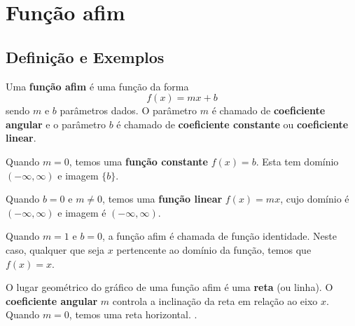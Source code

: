 \documentclass[../main.tex]{subfiles}
\begin{document}
\section{Função afim}\label{sec:FuncAfim}
\subsection{Definição e Exemplos}
Uma \textbf{função afim} é uma função da forma
\begin{equation}
f(x) = mx + b
\end{equation}
sendo $m$ e $b$ parâmetros  dados. O parâmetro $m$ é chamado de \textbf{coeficiente angular} e o parâmetro $b$ é chamado de \textbf{coeficiente constante} ou \textbf{coeficiente linear}.

Quando $m=0$, temos uma \textbf{função constante} $f(x) = b$. Esta tem domínio $(-\infty, \infty)$ e imagem $\{b\}$. 

 Quando $b=0$ e $m\neq 0$, temos uma \textbf{função linear} $f(x)=mx$, cujo domínio é $(-\infty, \infty)$ e imagem é $(-\infty, \infty)$. 
 
 Quando $m=1$ e $b=0$, a função afim é chamada de função identidade. Neste caso, qualquer que seja $x$ pertencente ao domínio da função, temos que $f(x)=x$.

O lugar geométrico do gráfico de uma função afim é uma \textbf{reta} (ou linha). O \textbf{coeficiente angular} \emph{$m$} controla a inclinação da reta em relação ao eixo $x$. Quando $m=0$, temos uma reta horizontal. .\\
\end{document}
